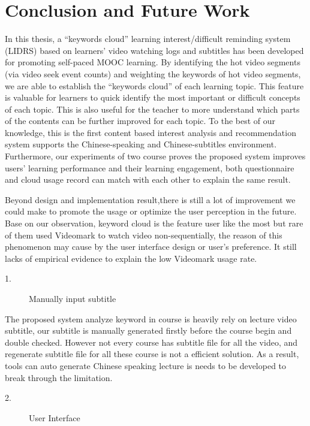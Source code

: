 \chapter{Conclusion and Future Work}\label{cha:Conclusion}
In this thesis, a “keywords cloud” learning interest/difficult reminding system (LIDRS) based on learners’ video watching logs and subtitles has been developed for promoting self-paced MOOC learning.
By identifying the hot video segments (via video seek event counts) and weighting the keywords of hot video segments, we are able to establish the “keywords cloud” of each learning topic.
This feature is valuable for learners to quick identify the most important or difficult concepts of each topic.
This is also useful for the teacher to more understand which parts of the contents can be further improved for each topic.
To the best of our knowledge, this is the first content based interest analysis and recommendation system supports the Chinese-speaking and Chinese-subtitles environment.
Furthermore, our experiments of two course proves the proposed system improves users' learning performance and their learning engagement, both questionnaire and cloud usage record can match with each other to explain the same result.

Beyond design and implementation result,there is still a lot of improvement we could make to promote the usage or optimize the user perception in the future.
Base on our observation, keyword cloud is the feature user like the most but rare of them used Videomark to watch video non-sequentially, the reason of this phenomenon may cause by the user interface design or user's preference.
It still lacks of empirical evidence to explain the low Videomark usage rate.

\begin{description}
  \item[1.] Manually input subtitle
\end{description}

The proposed system analyze keyword in course is heavily rely on lecture video subtitle, our subtitle is manually generated firstly before the course begin and double checked.
However not every course has subtitle file for all the video, and regenerate subtitle file for all these course is not a efficient solution.
As a result, tools can auto generate Chinese speaking lecture is needs to be developed to break through the limitation.

\begin{description}
  \item[2.] User Interface
\end{description}

